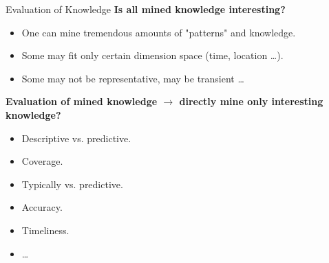 \begin{frame}{Evaluation of Knowledge}
	\textbf{Is all mined knowledge interesting?}
	\begin{itemize}
		\item One can mine tremendous amounts of "patterns" and knowledge.
		\item Some may fit only certain dimension space (time, location \ldots).
		\item Some may not be representative, may be transient \ldots
	\end{itemize}
	
	\textbf{Evaluation of mined knowledge $\rightarrow$ directly mine only 
	interesting knowledge?}
	\begin{itemize}
		\item Descriptive vs. predictive.
		\item Coverage.
		\item Typically vs. predictive.
		\item Accuracy.
		\item Timeliness.
		\item \ldots
	\end{itemize}
\end{frame}